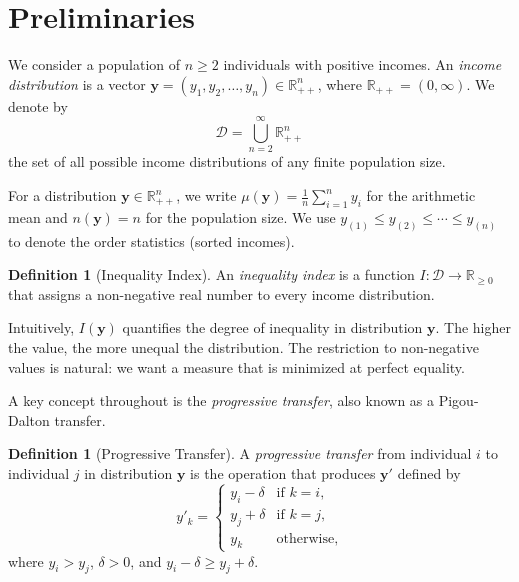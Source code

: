 \documentclass[12pt]{article}
\theoremstyle{plain}
\theoremstyle{definition}
\newtheorem{definition}[theorem]{Definition}
\theoremstyle{remark}
\newcommand{\R}{\mathbb{R}}
\newcommand{\bfy}{\mathbf{y}}
\newcommand{\D}{\mathcal{D}}
\begin{document}
\section{Preliminaries}\label{sec:prelim}

We consider a population of $n \geq 2$ individuals with positive incomes.
An \emph{income distribution} is a vector $\bfy = (y_1, y_2, \ldots, y_n) \in \R_{++}^n$, where $\R_{++} = (0, \infty)$.
We denote by
\begin{equation}\label{eq:D}
\D = \bigcup_{n=2}^{\infty} \R_{++}^n
\end{equation}
the set of all possible income distributions of any finite population size.

For a distribution $\bfy \in \R_{++}^n$, we write $\mu(\bfy) = \frac{1}{n}\sum_{i=1}^n y_i$ for the arithmetic mean and $n(\bfy) = n$ for the population size.
We use $y_{(1)} \leq y_{(2)} \leq \cdots \leq y_{(n)}$ to denote the order statistics (sorted incomes).

\begin{definition}[Inequality Index]\label{def:index}
An \emph{inequality index} is a function $I : \D \to \R_{\geq 0}$ that assigns a non-negative real number to every income distribution.
\end{definition}

Intuitively, $I(\bfy)$ quantifies the degree of inequality in distribution $\bfy$.
The higher the value, the more unequal the distribution.
The restriction to non-negative values is natural: we want a measure that is minimized at perfect equality.

A key concept throughout is the \emph{progressive transfer}, also known as a Pigou-Dalton transfer.

\begin{definition}[Progressive Transfer]\label{def:transfer}
A \emph{progressive transfer} from individual $i$ to individual $j$ in distribution $\bfy$ is the operation that produces $\bfy'$ defined by
\begin{equation}
y'_k = \begin{cases}
y_i - \delta & \text{if } k = i, \\
y_j + \delta & \text{if } k = j, \\
y_k & \text{otherwise},
\end{cases}
\end{equation}
where $y_i > y_j$, $\delta > 0$, and $y_i - \delta \geq y_j + \delta$.
\end{definition}
\end{document}
